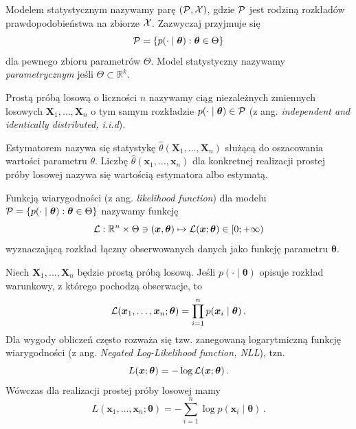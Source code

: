 \documentclass{myclass}
\numberwithin{equation}{subsection}
\begin{document}
\begin{definition}
Modelem statystycznym nazywamy parę \((\mathcal{P}, \mathcal{X})\), gdzie \(\mathcal{P}\) jest rodziną rozkładów
prawdopodobieństwa na zbiorze \(\mathcal{X}\). Zazwyczaj przyjmuje się
\[
\mathcal{P} = \{p(\cdot \mid \bm{\theta}) : \bm{\theta} \in \Theta \} 
\]
dla pewnego zbioru parametrów \(\Theta\). Model statystyczny nazywamy \emph{parametrycznym} jeśli
\(\Theta \subset \mathbb{R}^k\).
\end{definition}

\begin{definition}
Prostą próbą losową o liczności \(n\) nazywamy ciąg niezależnych zmiennych losowych
\(\bm{X}_1,\ldots,\bm{X}_n\) o tym samym rozkładzie \(p(\cdot \mid \bm{\theta}) \in \mathcal{P}\) (z ang.
\textit{independent and identically distributed, i.i.d}).
\end{definition}

\begin{definition}[Estymatora]
Estymatorem nazywa się statystykę \(\hat{\theta}(\bm{X}_1,\ldots,\bm{X}_n)\) służącą do oszacowania
wartości parametru \(\theta\). Liczbę \(\hat{\theta}(\bm{x}_1,\ldots,\bm{x}_n)\) dla konkretnej
realizacji prostej próby losowej nazywa się wartością estymatora albo estymatą.
\end{definition}

\begin{definition}
Funkcją wiarygodności (z ang. \textit{likelihood function}) dla modelu \(\mathcal{P} = \{p(\cdot \mid \bm{\theta}) :
\bm{\theta} \in \Theta\}\) nazywamy funkcję
\[
\mathcal{L}: \mathbb{R}^n \times \Theta \ni (\bm{x},\bm{\theta}) \mapsto \mathcal{L}(\bm{x};\bm{\theta}) \in [0; +\infty)
\]
wyznaczającą rozkład łączny obserwowanych danych jako funkcję parametru \(\bm{\theta}\).    
\end{definition}

Niech \(\bm{X}_1,\ldots,\bm{X}_n\) będzie prostą próbą losową. Jeśli \(p(\cdot \mid \bm{\theta})\)
opisuje rozkład warunkowy, z którego pochodzą obserwacje, to
\[
\mathcal{L}(\bm{x}_1,\ldots,\bm{x}_n;\bm{\theta}) = \prod_{i=1}^n p(\bm{x}_i \mid \bm{\theta})\,.
\]
Dla wygody obliczeń często rozważa się tzw. zanegowaną logarytmiczną funkcję wiarygodności (z ang.
\textit{Negated Log-Likelihood function, NLL}), tzn.
\[
L(\bm{x};\bm{\theta}) = - \log \mathcal{L}(\bm{x};\bm{\theta})\,.
\]
Wówczas dla realizacji prostej próby losowej mamy
\[
L(\bm{x}_1,\ldots,\bm{x}_n;\bm{\theta}) = -\sum_{i=1}^n \log p(\bm{x}_i \mid \bm{\theta})\,.
\]
\end{document}
